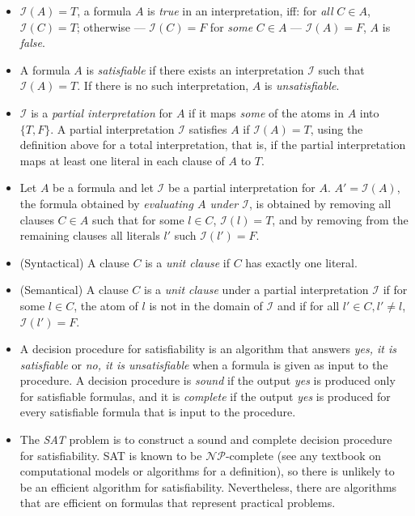 \documentclass[11pt]{report}
\begin{document}
\begin{itemize}
\item $\mathcal{I}(A)=T$, a formula $A$ is \emph{true} in an
interpretation, iff: for \emph{all} $C\in A$, $\mathcal{I}(C)=T$;
otherwise --- $\mathcal{I}(C)=F$ for \emph{some} $C\in A$ ---
$\mathcal{I}(A)=F$, $A$ is \emph{false}.

\item A formula $A$ is \emph{satisfiable} if there exists an
interpretation $\mathcal{I}$ such that $\mathcal{I}(A)=T$. If there is
no such interpretation, $A$ is \emph{unsatisfiable}.

\item $\mathcal{I}$ is a \emph{partial interpretation} for $A$ if it
maps \emph{some} of the atoms in $A$ into $\{T,F\}$. A partial
interpretation $\mathcal{I}$ satisfies $A$ if $\mathcal{I}(A)=T$, using
the definition above for a total interpretation, that is, if the partial
interpretation maps at least one literal in each clause of $A$ to $T$.

\item Let $A$ be a formula and let $\mathcal{I}$ be a partial
interpretation for $A$. $A'=\mathcal{I}(A)$, the formula obtained by
\emph{evaluating $A$ under $\mathcal{I}$}, is obtained by removing all
clauses $C\in A$ such that for some $l\in C$, $\mathcal{I}(l)=T$, and by
removing from the remaining clauses all literals $l'$ such
$\mathcal{I}(l')=F$.

\item (Syntactical) A clause $C$ is a \emph{unit clause} if $C$
has exactly one literal.

\item (Semantical) A clause $C$ is a \emph{unit clause} under a partial
interpretation $\mathcal{I}$ if for some $l\in C$, the atom of $l$
is not in the domain of $\mathcal{I}$ and if for all $l'\in C, l'\neq l$,
$\mathcal{I}(l')=F$.

\item A decision procedure for satisfiability is an algorithm that
answers \emph{yes, it is satisfiable} or \emph{no, it is unsatisfiable}
when a formula is given as input to the procedure. A decision procedure
is \emph{sound} if the output \emph{yes} is produced only for
satisfiable formulas, and it is \emph{complete} if the output \emph{yes}
is produced for every satisfiable formula that is input to the
procedure.

\item The \emph{SAT} problem is to construct a sound and complete
decision procedure for satisfiability. SAT is known to be
$\mathcal{NP}$-complete (see any textbook on computational models or
algorithms for a definition), so there is unlikely to be an efficient
algorithm for satisfiability. Nevertheless, there are algorithms that
are efficient on formulas that represent practical problems.

\end{itemize}
\end{document}
